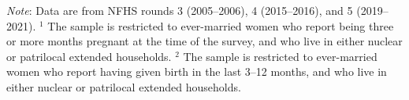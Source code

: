 \documentclass[10pt,twoside,reqno]{article}
\begin{document}
\begin{table}[H]
\sffamily
\caption{: None of the improvement in the outcomes is explained by changing composition in household structures}
\label{tab:decomposition_outcomes}
\vspace{-4pt}

\begin{scriptsize}
\setlength{\tabcolsep}{4pt}
\renewcommand{\arraystretch}{2.5}

\makebox[\linewidth][c]{%
%
}

\end{scriptsize}

\vspace{1ex}
\small\scriptsize{\textsf{\textit{Note}: Data are from NFHS rounds 3 (2005--2006), 4 (2015--2016), and 5 (2019--2021).}}
\newline
\small\scriptsize{\textsf{$^1$ The sample is restricted to ever-married women who report being three or more months pregnant at the time of the survey, and who live in either nuclear or patrilocal extended households.}}
\newline
\small\scriptsize{\textsf{$^2$ The sample is restricted to ever-married women who report having given birth in the last 3--12 months, and who live in either nuclear or patrilocal extended households.}}

\end{table}


\cleardoublepage


\end{document}
